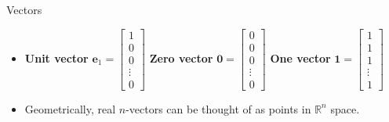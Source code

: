 \documentclass[aspectratio=169]{beamer}
\let\olditem\item
\renewcommand{\item}{\setlength{\itemsep}{\fill}\olditem}
\begin{document}
\begin{frame}[t]{Vectors}
\begin{itemize}
\item \textbf{Unit vector} $\mathbf{e}_1 = \begin{bmatrix} 1 \\ 0 \\ 0 \\ \vdots \\ 0 \end{bmatrix}$ \textbf{Zero vector} $\mathbf{0} = \begin{bmatrix} 0 \\ 0 \\ 0 \\ \vdots \\ 0 \end{bmatrix}$ \textbf{One vector} $\mathbf{1} = \begin{bmatrix} 1 \\ 1 \\ 1 \\ \vdots \\ 1 \end{bmatrix}$
\item Geometrically, real $n$-vectors can be thought of as points in $\mathbb{R}^n$ space.\\
\begin{center}
\end{center}
\end{itemize}
\end{frame}
\end{document}
